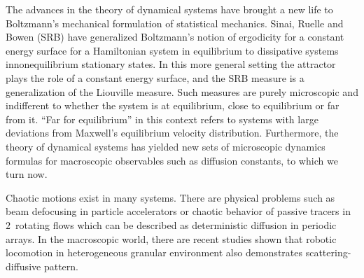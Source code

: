 \documentclass[aps,pre,
                showpacs,
                twocolumn,
                groupedaddress,
                floatfix]{revtex4-1}
\begin{document}
The advances in the theory of dynamical systems have brought a new life to Boltzmann's mechanical formulation of statistical mechanics. Sinai, Ruelle and Bowen (SRB) have generalized Boltzmann's notion of ergodicity for a constant energy surface for a Hamiltonian system in equilibrium to dissipative systems in{nonequilibrium} stationary states. In this more general setting the attractor plays the role of a constant energy surface, and the SRB measure is a generalization of the Liouville measure. Such measures are purely microscopic and indifferent to whether the system is at equilibrium, close to equilibrium or far from it. ``Far for equilibrium'' in this context refers to systems with large deviations from Maxwell's equilibrium velocity distribution. Furthermore, the theory of dynamical systems has yielded new sets of microscopic dynamics formulas for macroscopic observables such as diffusion constants, to which we turn now.

Chaotic motions exist in many systems. There are physical problems such as beam defocusing in particle accelerators  or chaotic behavior of passive tracers in $2$\dmn\ rotating flows which can be described as deterministic diffusion in periodic arrays. In the macroscopic world, there are recent studies shown that robotic locomotion in heterogeneous granular environment also demonstrates scattering-diffusive pattern.

%
%
\end{document}
